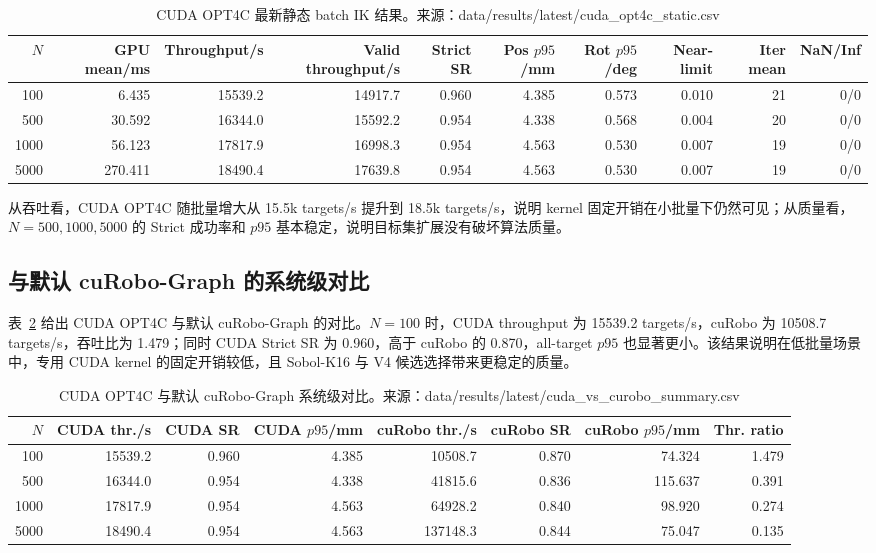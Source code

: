 \documentclass[twocolumn,a4paper,10pt]{ctexart}
\begin{document}
\begin{table}[t]
\centering
\caption{CUDA OPT4C 最新静态 batch IK 结果。来源：data/results/latest/cuda\_opt4c\_static.csv}
\label{tab:cuda-static}
\small
\begin{tabular}{rrrrrrrrrr}
\toprule
$N$ & GPU mean/ms & Throughput/s & Valid throughput/s & Strict SR & Pos $p95$/mm & Rot $p95$/deg & Near-limit & Iter mean & NaN/Inf\\
\midrule
100  & 6.435  & 15539.2 & 14917.7 & 0.960 & 4.385 & 0.573 & 0.010 & 21 & 0/0\\
500  & 30.592 & 16344.0 & 15592.2 & 0.954 & 4.338 & 0.568 & 0.004 & 20 & 0/0\\
1000 & 56.123 & 17817.9 & 16998.3 & 0.954 & 4.563 & 0.530 & 0.007 & 19 & 0/0\\
5000 & 270.411 & 18490.4 & 17639.8 & 0.954 & 4.563 & 0.530 & 0.007 & 19 & 0/0\\
\bottomrule
\end{tabular}
\end{table}

从吞吐看，CUDA OPT4C 随批量增大从 15.5k targets/s 提升到 18.5k targets/s，说明 kernel 固定开销在小批量下仍然可见；从质量看，$N=500,1000,5000$ 的 Strict 成功率和 $p95$ 基本稳定，说明目标集扩展没有破坏算法质量。

\subsection{与默认 cuRobo-Graph 的系统级对比}

表~\ref{tab:curobo} 给出 CUDA OPT4C 与默认 cuRobo-Graph 的对比。$N=100$ 时，CUDA throughput 为 15539.2 targets/s，cuRobo 为 10508.7 targets/s，吞吐比为 1.479；同时 CUDA Strict SR 为 0.960，高于 cuRobo 的 0.870，all-target $p95$ 也显著更小。该结果说明在低批量场景中，专用 CUDA kernel 的固定开销较低，且 Sobol-K16 与 V4 候选选择带来更稳定的质量。

\begin{table}[t]
\centering
\caption{CUDA OPT4C 与默认 cuRobo-Graph 系统级对比。来源：data/results/latest/cuda\_vs\_curobo\_summary.csv}
\label{tab:curobo}
\small
\begin{tabular}{rrrrrrrr}
\toprule
$N$ & CUDA thr./s & CUDA SR & CUDA $p95$/mm & cuRobo thr./s & cuRobo SR & cuRobo $p95$/mm & Thr. ratio\\
\midrule
100  & 15539.2 & 0.960 & 4.385 & 10508.7  & 0.870 & 74.324  & 1.479\\
500  & 16344.0 & 0.954 & 4.338 & 41815.6  & 0.836 & 115.637 & 0.391\\
1000 & 17817.9 & 0.954 & 4.563 & 64928.2  & 0.840 & 98.920  & 0.274\\
5000 & 18490.4 & 0.954 & 4.563 & 137148.3 & 0.844 & 75.047  & 0.135\\
\bottomrule
\end{tabular}
\end{table}
\end{document}
